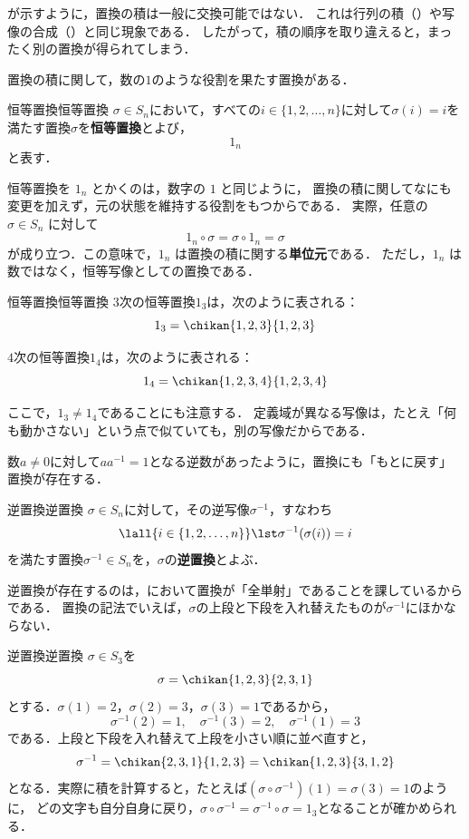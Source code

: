 が示すように，置換の積は一般に交換可能ではない．
これは行列の積（）や写像の合成（）と同じ現象である．
したがって，積の順序を取り違えると，まったく別の置換が得られてしまう．

置換の積に関して，数の$1$のような役割を果たす置換がある．



\begin{definition}{恒等置換}{恒等置換}
  $\sigma\in S_n$において，すべての$i \in \{1, 2, \dots, n\}$に対して$\sigma(i) = i$を満たす置換$\sigma$を\textbf{恒等置換}とよび，
  \[
  1_n
  \]
  と表す．
\end{definition}


恒等置換を $1_n$ とかくのは，数字の $1$ と同じように，
置換の積に関してなにも変更を加えず，元の状態を維持する役割をもつからである．
実際，任意の $\sigma\in S_n$ に対して
\[
1_n\circ\sigma=\sigma\circ 1_n=\sigma
\]
が成り立つ．この意味で，$1_n$ は置換の積に関する\textbf{単位元}である．
ただし，$1_n$ は数ではなく，恒等写像としての置換である．


\begin{example}{恒等置換}{恒等置換}
  $3$次の恒等置換$1_3$は，次のように表される：
  \[
  1_3 = \chikan{1, 2, 3}{1, 2, 3}
  \]

  $4$次の恒等置換$1_4$は，次のように表される：
  \[
  1_4 = \chikan{1, 2, 3, 4}{1, 2, 3, 4}
  \]

  ここで，$1_3 \ne 1_4$であることにも注意する．
  定義域が異なる写像は，たとえ「何も動かさない」という点で似ていても，別の写像だからである．
\end{example}

数$a \ne 0$に対して$a a^{-1} = 1$となる逆数があったように，置換にも「もとに戻す」置換が存在する．

\begin{definition}{逆置換}{逆置換}
  $\sigma\in S_n$に対して，その逆写像$\sigma^{-1}$，すなわち
  \[
  \lall{i \in \{1, 2, \dots, n\}} \lst \sigma^{-1}(\sigma(i)) = i
  \]
  を満たす置換$\sigma^{-1} \in S_n$を，$\sigma$の\textbf{逆置換}とよぶ．
\end{definition}

逆置換が存在するのは，において置換が「全単射」であることを課しているからである．
置換の記法でいえば，$\sigma$の上段と下段を入れ替えたものが$\sigma^{-1}$にほかならない．

\begin{example}{逆置換}{逆置換}
  $\sigma \in S_3$を
  \[
  \sigma = \chikan{1, 2, 3}{2, 3, 1}
  \]
  とする．$\sigma(1) = 2$，$\sigma(2) = 3$，$\sigma(3) = 1$であるから，
  \[
    \sigma^{-1}(2) = 1, \quad \sigma^{-1}(3) = 2, \quad \sigma^{-1}(1) = 3
  \]
  である．上段と下段を入れ替えて上段を小さい順に並べ直すと，
  \[
  \sigma^{-1} = \chikan{2, 3, 1}{1, 2, 3} = \chikan{1, 2, 3}{3, 1, 2}
  \]
  となる．実際に積を計算すると，たとえば$(\sigma \circ \sigma^{-1})(1) = \sigma(3) = 1$のように，
  どの文字も自分自身に戻り，$\sigma \circ \sigma^{-1} = \sigma^{-1} \circ \sigma = 1_3$となることが確かめられる．
\end{example}

